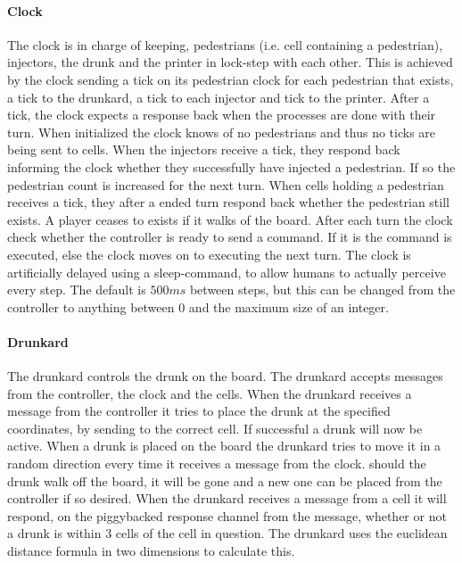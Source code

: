 \documentclass[a4paper, 11pt]{article}
\begin{document}
\paragraph{Clock} %
\label{par:clock}
The clock is in charge of keeping, pedestrians (i.e. cell containing a pedestrian), injectors, the drunk and the printer in lock-step with each other. This is achieved by the clock sending a tick on its pedestrian clock for each pedestrian that exists, a tick to the drunkard, a tick to each injector and tick to the printer. After a tick, the clock expects a response back when the processes are done with their turn. When initialized the clock knows of no pedestrians and thus no ticks are being sent to cells. When the injectors receive a tick, they respond back informing the clock whether they successfully have injected a pedestrian. If so the pedestrian count is increased for the next turn. When cells holding a pedestrian receives a tick, they after a ended turn respond back whether the pedestrian still exists. A player ceases to exists if it walks of the board. After each turn the clock check whether the controller is ready to send a command. If it is the command is executed, else the clock moves on to executing the next turn. The clock is artificially delayed using a sleep-command, to allow humans to actually perceive every step. The default is $500 ms$ between steps, but this can be changed from the controller to anything between 0 and the maximum size of an integer.

\paragraph{Drunkard} %
\label{par:drunkard}
The drunkard controls the drunk on the board. The drunkard accepts messages from the controller, the clock and the cells. When the drunkard receives a message from the controller it tries to place the drunk at the specified coordinates, by sending to the correct cell. If successful a drunk will now be active. When a drunk is placed on the board the drunkard tries to move it in a random direction every time it receives a message from the clock. should the drunk walk off the board, it will be gone and a new one can be placed from the controller if so desired. When the drunkard receives a message from a cell it will respond, on the piggybacked response channel from the message, whether or not a drunk is within 3 cells of the cell in question. The drunkard uses the euclidean distance formula in two dimensions to calculate this.
\end{document}
